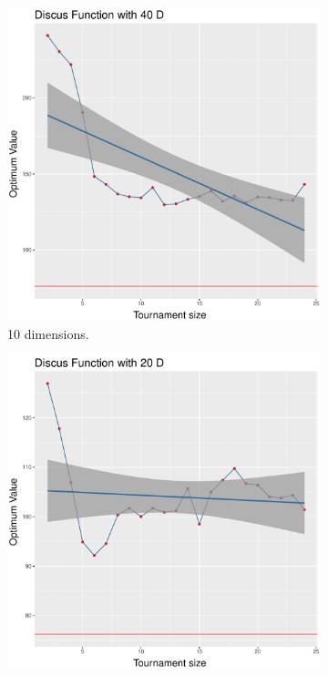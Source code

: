 \begin{figure}[t]
	\begin{subfigure}[b]{0.33\textwidth}
		\centering
		\includegraphics[width=\textwidth]{img/unimodal_sbx_11_dim_40.pdf}
		\caption{10 dimensions.}
	\end{subfigure}
	\begin{subfigure}[b]{0.33\textwidth}
		\centering
		\includegraphics[width=\textwidth]{img/unimodal_sbx_11_dim_20.pdf}

\end{subfigure}
\end{figure}
